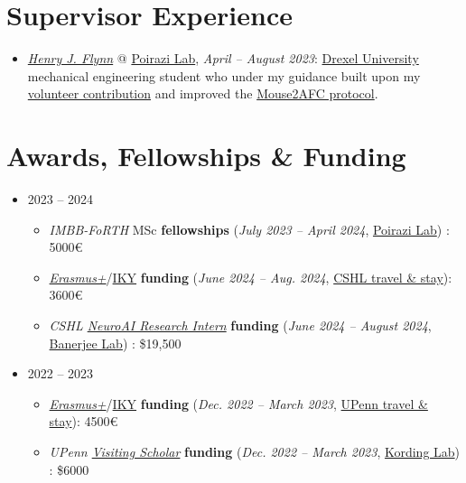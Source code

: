 \documentclass[letterpaper,11pt]{article}
\begin{document}
\section{Supervisor Experience}
  \begin{itemize}
    \item \textit{\href{https://www.linkedin.com/in/henry-flynn/}{Henry J. Flynn}} @ \hyperref[PoiraziLabMarker]{Poirazi Lab}, \textit{April -- August 2023}: \href{https://drexel.edu/}{{} Drexel University} mechanical engineering student who under my guidance built upon my \hyperref[PoiraziLabVolMarker]{volunteer contribution} and improved the \href{https://github.com/Poirazi-Lab/mouse2afc}{Mouse2AFC protocol}.
  \end{itemize}

\section{Awards, Fellowships \& Funding}
\begin{itemize}
  \item 2023 -- 2024
    \setlength\itemsep{-0.3em}
    \begin{itemize}
      \item \textit{IMBB-FoRTH} MSc \textbf{fellowships} (\textit{July 2023 -- April 2024}, \hyperref[PoiraziLabMarker]{Poirazi Lab}) \label{IMBBFoRTHFellowshipMarker}: 5000\euro
      \item \textit{\href{https://erasmus-plus.ec.europa.eu/opportunities/opportunities-for-individuals/students/traineeships-abroad-for-students}{Erasmus+}}/\href{https://www.iky.gr/en/discover-erasmus}{IKY} \textbf{funding} (\textit{June 2024 -- Aug. 2024}, \hyperref[BanerjeeLabMarker]{CSHL travel \& stay}): 3600\euro
      \item \textit{CSHL \href{https://www.cshl.edu/research/neuroscience/neuroai/}{NeuroAI Research Intern}} \textbf{funding} (\textit{June 2024 -- August 2024}, \hyperref[BanerjeeLabMarker]{Banerjee Lab}) \label{CSHLNeuroAIResearchInternFundingMarker}: \$19,500
    \end{itemize}
  \item 2022 -- 2023
    \setlength\itemsep{-0.3em}
    \begin{itemize}
        \item \textit{\href{https://erasmus-plus.ec.europa.eu/opportunities/opportunities-for-individuals/students/traineeships-abroad-for-students}{Erasmus+}}/\href{https://www.iky.gr/en/discover-erasmus}{IKY} \textbf{funding} (\textit{Dec. 2022 -- March 2023}, \hyperref[KordingLabMarker]{UPenn travel \& stay}): 4500\euro
        \item \textit{UPenn \href{https://global.upenn.edu/isss/j1scholar}{Visiting Scholar}} \textbf{funding} (\textit{Dec. 2022 -- March 2023}, \hyperref[KordingLabMarker]{Kording Lab}) \label{UPennVisitingScholarFundingMarker}: \$6000
    \end{itemize}
\end{itemize}
\end{document}
